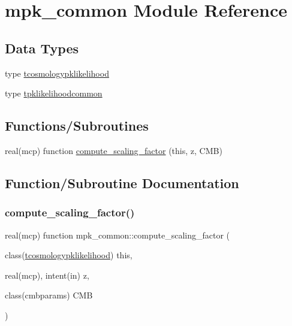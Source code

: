 \hypertarget{namespacempk__common}{}\section{mpk\+\_\+common Module Reference}
\label{namespacempk__common}
\subsection*{Data Types}
\begin{DoxyCompactItemize}
\item 
type \mbox{\hyperlink{structmpk__common_1_1tcosmologypklikelihood}{tcosmologypklikelihood}}
\item 
type \mbox{\hyperlink{structmpk__common_1_1tpklikelihoodcommon}{tpklikelihoodcommon}}
\end{DoxyCompactItemize}
\subsection*{Functions/\+Subroutines}
\begin{DoxyCompactItemize}
\item 
real(mcp) function \mbox{\hyperlink{namespacempk__common_ac0cd44f346d288d9d62e615aaa916027}{compute\+\_\+scaling\+\_\+factor}} (this, z, C\+MB)
\end{DoxyCompactItemize}


\subsection{Function/\+Subroutine Documentation}
\mbox{\label{namespacempk__common_ac0cd44f346d288d9d62e615aaa916027}} 
\subsubsection{\texorpdfstring{compute\+\_\+scaling\+\_\+factor()}{compute\_scaling\_factor()}}
{\footnotesize\ttfamily real(mcp) function mpk\+\_\+common\+::compute\+\_\+scaling\+\_\+factor (\begin{DoxyParamCaption}\item[{class(\mbox{\hyperlink{structmpk__common_1_1tcosmologypklikelihood}{tcosmologypklikelihood}})}]{this,  }\item[{real(mcp), intent(in)}]{z,  }\item[{class(cmbparams)}]{C\+MB }\end{DoxyParamCaption})\hspace{0.3cm}{\ttfamily [private]}}

